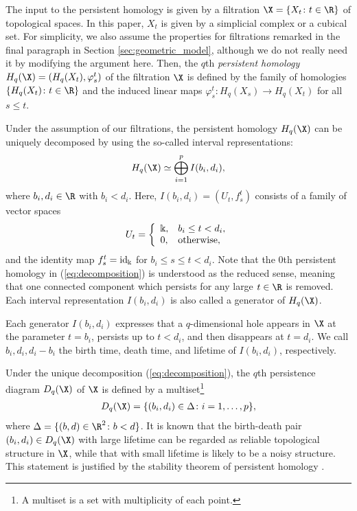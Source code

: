 \documentclass[smallextended]{svjour3}
\begin{document}
The input to the persistent homology is given by a filtration $\X=\{X_t\colon t\in \R\}$ of topological spaces. 
In this paper, $X_t$ is given by a simplicial complex or a cubical set.
For simplicity, we also assume the properties for filtrations remarked in the final paragraph in Section \ref{sec:geometric_model}, although we do not really need it by modifying the argument here. 
Then, the $q$th \emph{persistent homology} $H_q(\X)=(H_q(X_t),\varphi_s^t)$ of the filtration $\X$ is defined by the family of homologies $\{H_q(X_t)\colon t\in\R\}$ and the induced linear maps $\varphi_s^t: H_q(X_s)\rightarrow H_q(X_t)$ for all $s\leq t$. 

Under the assumption of our filtrations, the persistent homology $H_q(\X)$ can be uniquely decomposed by using the so-called interval representations:
\begin{align}\label{eq:decomposition}
H_q(\X)\simeq \bigoplus_{i=1}^pI(b_i,d_i),
\end{align}
where $b_i,d_i\in\R$ with $b_i<d_i$.
Here, $I(b_i,d_i)=(U_t,f_s^t)$ consists of a family of vector spaces
\begin{align*}
U_t=\left\{\begin{array}{ll}
\Bbbk,&b_i\leq t<d_i,\\
0,&{\rm otherwise,}
\end{array}\right.
\end{align*}
and the identity map $f_s^t={\rm id}_\Bbbk$ for $b_i\leq s\leq t < d_i$. Note that the $0$th persistent homology in (\ref{eq:decomposition}) is understood as the reduced sense, meaning that one connected component which persists for any large $t\in\R$ is removed. Each interval representation $I(b_i,d_i)$ is also  called a generator of $H_q(\X)$. 

Each generator $I(b_i,d_i)$ expresses that a $q$-dimensional hole appears in $\X$ at the parameter $t=b_i$, persists up to $t<d_i$, and then disappears at $t=d_i$. We call $b_i, d_i, d_i-b_i$ the birth time, death time, and lifetime of $I(b_i,d_i)$, respectively. 

Under the unique decomposition (\ref{eq:decomposition}), the $q$th persistence diagram $D_q(\X)$ of $\X$ is defined by a multiset\footnote{A multiset is a set with multiplicity of each point.}
\begin{align*}
D_q(\X)=\{(b_i,d_i)\in \Delta\colon i=1,\dots,p\},
\end{align*}
where $\Delta=\{(b,d)\in\R^2\colon b < d\}$. It is known that the birth-death pair $(b_i,d_i)\in D_q(\X)$ with large lifetime can be regarded as reliable topological structure in $\X$, while that with small lifetime is likely to be a noisy structure. This statement is justified by the stability theorem of persistent homology \citep{ceh}.
\end{document}
